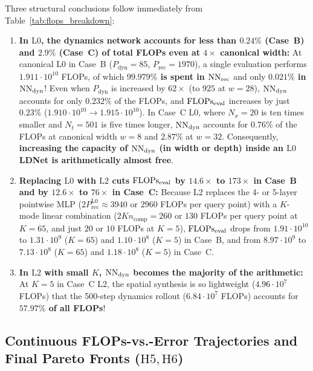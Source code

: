 Three structural conclusions follow immediately from Table~\ref{tab:flops_breakdown}:
\begin{enumerate}[leftmargin=2em]
  \item \textbf{In $\mathrm{L0}$, the dynamics network accounts for less than $0.24\%$ (Case~B) and $2.9\%$ (Case~C) of total FLOPs even at $4\times$ canonical width:} At canonical $\mathrm{L0}$ in Case~B ($P_{\mathrm{dyn}} = 85$, $P_{\mathrm{rec}} = 1970$), a single evaluation performs $1.911\cdot 10^{10}$ FLOPs, of which \textbf{$99.979\%$ is spent in $\mathrm{NN}_{\mathrm{rec}}$} and only \textbf{$0.021\%$ in $\mathrm{NN}_{\mathrm{dyn}}$}! Even when $P_{\mathrm{dyn}}$ is increased by $62\times$ (to $925$ at $w=28$), $\mathrm{NN}_{\mathrm{dyn}}$ accounts for only $0.232\%$ of the FLOPs, and $\mathrm{FLOPs}_{\mathrm{eval}}$ increases by just $0.23\%$ ($1.910\cdot 10^{10} \to 1.915\cdot 10^{10}$). In Case~C $\mathrm{L0}$, where $N_x = 20$ is ten times smaller and $N_t = 501$ is five times longer, $\mathrm{NN}_{\mathrm{dyn}}$ accounts for $0.76\%$ of the FLOPs at canonical width $w=8$ and $2.87\%$ at $w=32$. Consequently, \textbf{increasing the capacity of $\mathrm{NN}_{\mathrm{dyn}}$ (in width or depth) inside an $\mathrm{L0}$ LDNet is arithmetically almost free}.
  \item \textbf{Replacing $\mathrm{L0}$ with $\mathrm{L2}$ cuts $\mathrm{FLOPs}_{\mathrm{eval}}$ by $14.6\times$ to $173\times$ in Case~B and by $12.6\times$ to $76\times$ in Case~C:} Because $\mathrm{L2}$ replaces the 4- or 5-layer pointwise MLP ($2 P_{\mathrm{rec}}^{\mathrm{L0}} \approx 3940$ or $2960$ FLOPs per query point) with a $K$-mode linear combination ($2 K n_{\mathrm{comp}} = 260$ or $130$ FLOPs per query point at $K=65$, and just $20$ or $10$ FLOPs at $K=5$), $\mathrm{FLOPs}_{\mathrm{eval}}$ drops from $1.91\cdot 10^{10}$ to $1.31\cdot 10^9$ ($K=65$) and $1.10\cdot 10^8$ ($K=5$) in Case~B, and from $8.97\cdot 10^9$ to $7.13\cdot 10^8$ ($K=65$) and $1.18\cdot 10^8$ ($K=5$) in Case~C.
  \item \textbf{In $\mathrm{L2}$ with small $K$, $\mathrm{NN}_{\mathrm{dyn}}$ becomes the majority of the arithmetic:} At $K=5$ in Case~C $\mathrm{L2}$, the spatial synthesis is so lightweight ($4.96\cdot 10^7$ FLOPs) that the 500-step dynamics rollout ($6.84\cdot 10^7$ FLOPs) accounts for \textbf{$57.97\%$ of all FLOPs}!
\end{enumerate}

\subsection{Continuous FLOPs-vs.-Error Trajectories and Final Pareto Fronts (\texorpdfstring{$\mathrm{H5}, \mathrm{H6}$}{H5, H6})}

